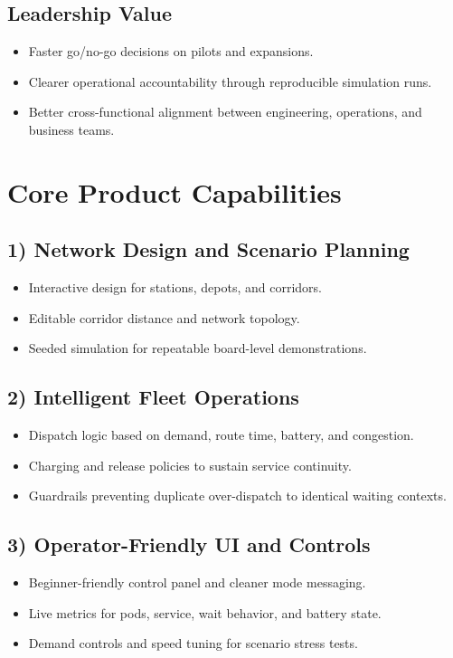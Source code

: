 \documentclass[11pt,a4paper]{article}
\begin{document}
\subsection*{Leadership Value}
\begin{itemize}
  \item Faster go/no-go decisions on pilots and expansions.
  \item Clearer operational accountability through reproducible simulation runs.
  \item Better cross-functional alignment between engineering, operations, and business teams.
\end{itemize}

\section{Core Product Capabilities}
\subsection*{1) Network Design and Scenario Planning}
\begin{itemize}
  \item Interactive design for stations, depots, and corridors.
  \item Editable corridor distance and network topology.
  \item Seeded simulation for repeatable board-level demonstrations.
\end{itemize}

\subsection*{2) Intelligent Fleet Operations}
\begin{itemize}
  \item Dispatch logic based on demand, route time, battery, and congestion.
  \item Charging and release policies to sustain service continuity.
  \item Guardrails preventing duplicate over-dispatch to identical waiting contexts.
\end{itemize}

\subsection*{3) Operator-Friendly UI and Controls}
\begin{itemize}
  \item Beginner-friendly control panel and cleaner mode messaging.
  \item Live metrics for pods, service, wait behavior, and battery state.
  \item Demand controls and speed tuning for scenario stress tests.
\end{itemize}
\end{document}
